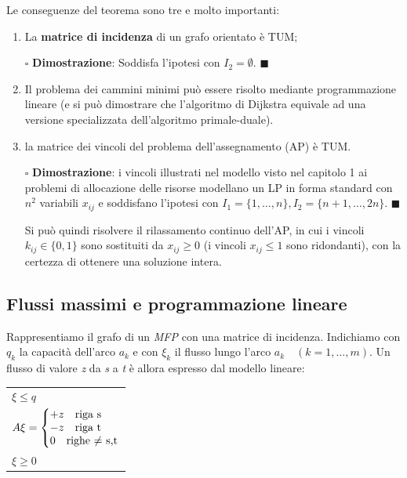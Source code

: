 \documentclass[11pt]{book}
\makeatletter
\newenvironment{sistema}%
{\left\lbrace\begin{array}{@{}l@{}}}%
{\end{array}\right.}
\makeatother
\begin{document}
Le conseguenze del teorema sono tre e molto importanti:

\begin{enumerate}
\item La {\bf matrice di incidenza} di un grafo orientato \`e TUM;

\vspace{11pt}
$\square$ {\bf Dimostrazione}: Soddisfa l'ipotesi con $I_2 =
\emptyset$. $\blacksquare$
\vspace{11pt}

\item Il problema dei cammini minimi pu\`o essere risolto mediante
  programmazione lineare (e si pu\`o dimostrare che l'algoritmo di
  Dijkstra equivale ad una versione specializzata dell'algoritmo
  primale-duale).

\item la matrice dei vincoli del problema dell'assegnamento (AP) \`e
  TUM.
  
  \vspace{11pt} $\square$ {\bf Dimostrazione}: i vincoli illustrati
  nel modello visto nel capitolo 1 ai problemi di allocazione delle
  risorse modellano un LP in forma standard con $n^2$ variabili
  $x_{ij}$ e soddisfano l'ipotesi con $I_1 = \{1,\dots,n\}, I_2 = \{
  n+1,\dots,2n\}$.  $\blacksquare$
  \vspace{11pt}

  Si pu\`o quindi risolvere il rilassamento continuo dell'AP, in cui i
  vincoli $k_{ij} \in \{0,1\}$ sono sostituiti da $x_{ij} \geq 0$ (i
  vincoli $x_{ij} \leq 1$ sono ridondanti), con la certezza di
  ottenere una soluzione intera.

\end{enumerate}


\subsection{Flussi massimi e programmazione lineare}

Rappresentiamo il grafo di un {\em MFP} con una matrice di
incidenza. Indichiamo con $q_k$ la capacit\`a dell'arco $a_k$ e con
$\xi_k$ il flusso lungo l'arco $a_k\quad(k = 1,\dots,m)$. Un flusso di
valore {\em z} da {\em s} a {\em t} \`e allora espresso dal modello
lineare:

\vspace{11pt}
\begin{center}
\begin{tabular}{l}
$\xi \leq q$\\
$A\xi =
  \begin{sistema}
    +z\quad \text{riga s}\\
    -z\quad \text{riga t}\\
    0 \quad \text{righe $\neq$ s,t}
  \end{sistema}
$\\
$\xi \geq 0$\\
\end{tabular}
\end{center}
\vspace{11pt}
\end{document}
